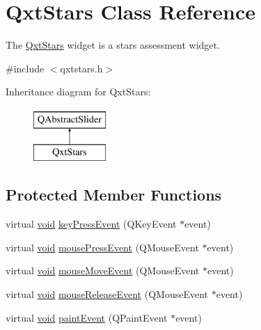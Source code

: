\hypertarget{class_qxt_stars}{\section{Qxt\-Stars Class Reference}
\label{class_qxt_stars}
}


The \hyperlink{class_qxt_stars}{Qxt\-Stars} widget is a stars assessment widget.  




{\ttfamily \#include $<$qxtstars.\-h$>$}

Inheritance diagram for Qxt\-Stars\-:\begin{figure}[H]
\begin{center}
\leavevmode
\includegraphics[height=2.000000cm]{class_qxt_stars}
\end{center}
\end{figure}
\subsection*{Protected Member Functions}
\begin{DoxyCompactItemize}
\item 
virtual \hyperlink{group___u_a_v_objects_plugin_ga444cf2ff3f0ecbe028adce838d373f5c}{void} \hyperlink{class_qxt_stars_ac74e5063746c60a7fd382e17fb62e00b}{key\-Press\-Event} (Q\-Key\-Event $\ast$event)
\item 
virtual \hyperlink{group___u_a_v_objects_plugin_ga444cf2ff3f0ecbe028adce838d373f5c}{void} \hyperlink{class_qxt_stars_aca52b8e4314a2798bc736388ee7aeee6}{mouse\-Press\-Event} (Q\-Mouse\-Event $\ast$event)
\item 
virtual \hyperlink{group___u_a_v_objects_plugin_ga444cf2ff3f0ecbe028adce838d373f5c}{void} \hyperlink{class_qxt_stars_ab9551ac1d7b36cd9b1600e6c3fd96291}{mouse\-Move\-Event} (Q\-Mouse\-Event $\ast$event)
\item 
virtual \hyperlink{group___u_a_v_objects_plugin_ga444cf2ff3f0ecbe028adce838d373f5c}{void} \hyperlink{class_qxt_stars_a7838e9f07476700086e6b821525bd5e3}{mouse\-Release\-Event} (Q\-Mouse\-Event $\ast$event)
\item 
virtual \hyperlink{group___u_a_v_objects_plugin_ga444cf2ff3f0ecbe028adce838d373f5c}{void} \hyperlink{class_qxt_stars_a79767f7c2a9f6fc94b4ad1fd0200db0a}{paint\-Event} (Q\-Paint\-Event $\ast$event)
\end{DoxyCompactItemize}


